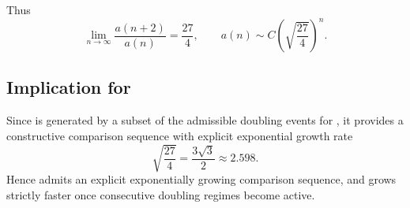 \documentclass[12pt, oneside]{article}   	%
\numberwithin{equation}{section}          %
\theoremstyle{definition}
\begin{document}
Thus
\[
\lim_{n\to\infty}\frac{a(n+2)}{a(n)}=\frac{27}{4},
\qquad
a(n) \sim C\left(\sqrt{\frac{27}{4}}\right)^n.
\]

\subsection*{Implication for }

Since  is generated by a subset of the admissible doubling events
for , it provides a constructive comparison sequence with
explicit exponential growth rate
\[
\sqrt{\frac{27}{4}} = \frac{3\sqrt{3}}{2} \approx 2.598.
\]
Hence  admits an explicit exponentially growing comparison sequence,
and grows strictly faster once consecutive doubling regimes become active.


\clearpage


\end{document}
